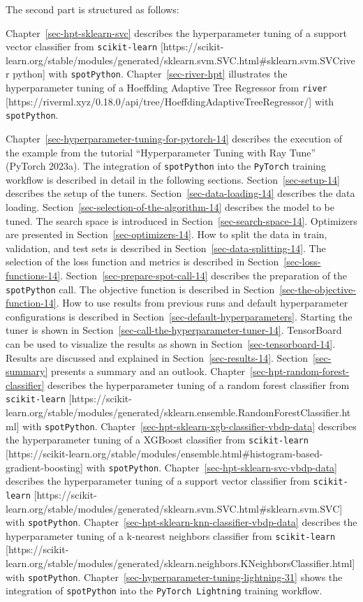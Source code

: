 \documentclass[
  letterpaper,
  DIV=11,
  numbers=noendperiod]{scrreprt}
\begin{document}
The second part is structured as follows:

Chapter~\ref{sec-hpt-sklearn-svc} describes the hyperparameter tuning of
a support vector classifier from \texttt{scikit-learn}
{[}https://scikit-learn.org/stable/modules/generated/sklearn.svm.SVC.html\#sklearn.svm.SVCriver
python{]} with \texttt{spotPython}. Chapter~\ref{sec-river-hpt}
illustrates the hyperparameter tuning of a Hoeffding Adaptive Tree
Regressor from \texttt{river}
{[}https://riverml.xyz/0.18.0/api/tree/HoeffdingAdaptiveTreeRegressor/{]}
with \texttt{spotPython}.

Chapter~\ref{sec-hyperparameter-tuning-for-pytorch-14} describes the
execution of the example from the tutorial ``Hyperparameter Tuning with
Ray Tune'' (PyTorch 2023a). The integration of \texttt{spotPython} into
the \texttt{PyTorch} training workflow is described in detail in the
following sections. Section~\ref{sec-setup-14} describes the setup of
the tuners. Section~\ref{sec-data-loading-14} describes the data
loading. Section~\ref{sec-selection-of-the-algorithm-14} describes the
model to be tuned. The search space is introduced in
Section~\ref{sec-search-space-14}. Optimizers are presented in
Section~\ref{sec-optimizers-14}. How to split the data in train,
validation, and test sets is described in
Section~\ref{sec-data-splitting-14}. The selection of the loss function
and metrics is described in Section~\ref{sec-loss-functions-14}.
Section~\ref{sec-prepare-spot-call-14} describes the preparation of the
\texttt{spotPython} call. The objective function is described in
Section~\ref{sec-the-objective-function-14}. How to use results from
previous runs and default hyperparameter configurations is described in
Section~\ref{sec-default-hyperparameters}. Starting the tuner is shown
in Section~\ref{sec-call-the-hyperparameter-tuner-14}. TensorBoard can
be used to visualize the results as shown in
Section~\ref{sec-tensorboard-14}. Results are discussed and explained in
Section~\ref{sec-results-14}. Section~\ref{sec-summary} presents a
summary and an outlook. Chapter~\ref{sec-hpt-random-forest-classifier}
describes the hyperparameter tuning of a random forest classifier from
\texttt{scikit-learn}
{[}https://scikit-learn.org/stable/modules/generated/sklearn.ensemble.RandomForestClassifier.html{]}
with \texttt{spotPython}.
Chapter~\ref{sec-hpt-sklearn-xgb-classifier-vbdp-data} describes the
hyperparameter tuning of a XGBoost classifier from \texttt{scikit-learn}
{[}https://scikit-learn.org/stable/modules/ensemble.html\#histogram-based-gradient-boosting{]}
with \texttt{spotPython}. Chapter~\ref{sec-hpt-sklearn-svc-vbdp-data}
describes the hyperparameter tuning of a support vector classifier from
\texttt{scikit-learn}
{[}https://scikit-learn.org/stable/modules/generated/sklearn.svm.SVC.html\#sklearn.svm.SVC{]}
with \texttt{spotPython}.
Chapter~\ref{sec-hpt-sklearn-knn-classifier-vbdp-data} describes the
hyperparameter tuning of a k-nearest neighbors classifier from
\texttt{scikit-learn}
{[}https://scikit-learn.org/stable/modules/generated/sklearn.neighbors.KNeighborsClassifier.html{]}
with \texttt{spotPython}.
Chapter~\ref{sec-hyperparameter-tuning-lightning-31} shows the
integration of \texttt{spotPython} into the \texttt{PyTorch\ Lightning}
training workflow.
\end{document}
